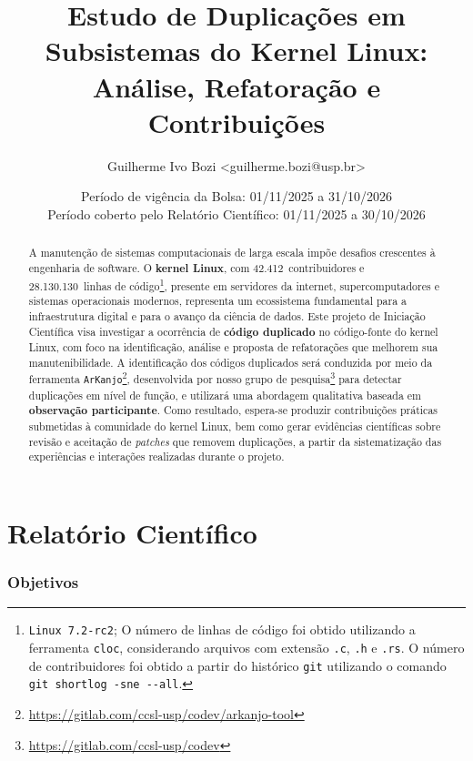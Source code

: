 \documentclass[oneside]{abntlatex}
\title{Estudo de Duplicações em Subsistemas do Kernel Linux: Análise, Refatoração e Contribuições}
\author{Guilherme Ivo Bozi <guilherme.bozi@usp.br>}
\date{%
Período de vigência da Bolsa: 01/11/2025 a 31/10/2026 \\
Período coberto pelo Relatório Científico: 01/11/2025 a 30/10/2026%
}
\def\kernelauthor{42.412}
\def\kernelloc{28.130.130}
\begin{document}
\pretext

\backcover

\begin{abstract}
A manutenção de sistemas computacionais de larga escala impõe desafios crescentes à engenharia de software. O \textbf{kernel Linux}, com \kernelauthor~contribuidores e \kernelloc~linhas de código\footnote{\texttt{Linux 7.2-rc2}; O número de linhas de código foi obtido utilizando a ferramenta \texttt{cloc}, considerando arquivos com extensão \texttt{.c}, \texttt{.h} e \texttt{.rs}. O número de contribuidores foi obtido a partir do histórico \texttt{git} utilizando o comando \texttt{git shortlog -sne -{}-all}.}, presente em servidores da internet, supercomputadores e sistemas operacionais modernos\cite{Corbet2017}, representa um ecossistema fundamental para a infraestrutura digital e para o avanço da ciência de dados. Este projeto de Iniciação Científica visa investigar a ocorrência de \textbf{código duplicado} no código-fonte do kernel Linux, com foco na identificação, análise e proposta de refatorações que melhorem sua manutenibilidade\cite{Alves2013}. A identificação dos códigos duplicados será conduzida por meio da ferramenta \texttt{ArKanjo}\cite{arcanjotese}\footnote{\url{https://gitlab.com/ccsl-usp/codev/arkanjo-tool}}, desenvolvida por nosso grupo de pesquisa\footnote{\url{https://gitlab.com/ccsl-usp/codev}} para detectar duplicações em nível de função, e utilizará uma abordagem qualitativa baseada em \textbf{observação participante}\cite{Seaman2008,Robson2016,Wen2021}. Como resultado, espera-se produzir contribuições práticas submetidas à comunidade do kernel Linux, bem como gerar evidências científicas sobre revisão e aceitação de \textit{patches} que removem duplicações, a partir da sistematização das experiências e interações realizadas durante o projeto.
\end{abstract}

\maintext

\part{Relatório Científico}

\section{Objetivos}
\end{document}
